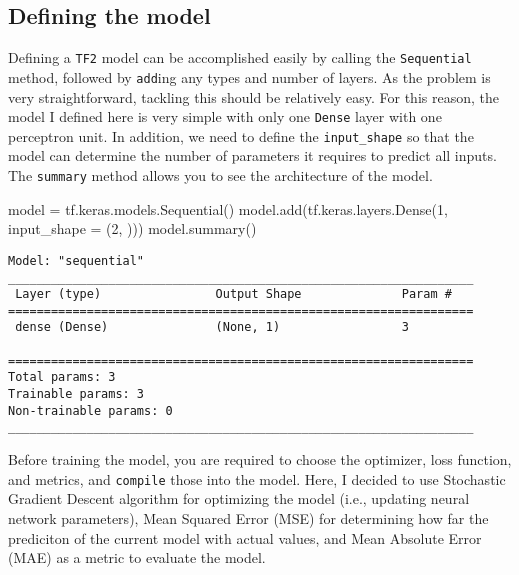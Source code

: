 \documentclass[
  letterpaper,
  DIV=11,
  numbers=noendperiod]{scrreprt}
\newenvironment{Shaded}{\begin{snugshade}}{\end{snugshade}}
\newcommand{\DecValTok}[1]{\textcolor[rgb]{0.68,0.00,0.00}{#1}}
\newcommand{\NormalTok}[1]{\textcolor[rgb]{0.00,0.23,0.31}{#1}}
\newcommand{\OperatorTok}[1]{\textcolor[rgb]{0.37,0.37,0.37}{#1}}
\begin{document}
\hypertarget{defining-the-model}{%
\subsection{Defining the model}\label{defining-the-model}}

Defining a \texttt{TF2} model can be accomplished easily by calling the
\texttt{Sequential} method, followed by \texttt{add}ing any types and
number of layers. As the problem is very straightforward, tackling this
should be relatively easy. For this reason, the model I defined here is
very simple with only one \texttt{Dense} layer with one perceptron unit.
In addition, we need to define the \texttt{input\_shape} so that the
model can determine the number of parameters it requires to predict all
inputs. The \texttt{summary} method allows you to see the architecture
of the model.

\begin{Shaded}
\begin{Highlighting}[]
\NormalTok{model }\OperatorTok{=}\NormalTok{ tf.keras.models.Sequential()}
\NormalTok{model.add(tf.keras.layers.Dense(}\DecValTok{1}\NormalTok{, input\_shape }\OperatorTok{=}\NormalTok{ (}\DecValTok{2}\NormalTok{, )))}
\NormalTok{model.summary()}
\end{Highlighting}
\end{Shaded}

\begin{verbatim}
Model: "sequential"
_________________________________________________________________
 Layer (type)                Output Shape              Param #   
=================================================================
 dense (Dense)               (None, 1)                 3         
                                                                 
=================================================================
Total params: 3
Trainable params: 3
Non-trainable params: 0
_________________________________________________________________
\end{verbatim}

Before training the model, you are required to choose the optimizer,
loss function, and metrics, and \texttt{compile} those into the model.
Here, I decided to use Stochastic Gradient Descent algorithm for
optimizing the model (i.e., updating neural network parameters), Mean
Squared Error (MSE) for determining how far the prediciton of the
current model with actual values, and Mean Absolute Error (MAE) as a
metric to evaluate the model.
\end{document}
